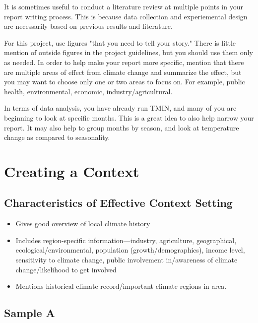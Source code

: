 \documentclass{article}\usepackage[]{graphicx}\usepackage[]{color}
\begin{document}
It is sometimes useful to conduct a literature review at multiple points in your report writing process. This is because data collection and experiemental design are necessarily based on previous results and literature.

For this project, use figures "that you need to tell your story." There is little mention of outside figures in the project guidelines, but you should use them only as needed. 
In order to help make your report more specific, mention that there are multiple areas of effect from climate change and summarize the effect, but you may want to choose only one or two areas to focus on. For example, public health, environmental, economic, industry/agricultural. 

In terms of data analysis, you have already run TMIN, and many of you are beginning to look at specific months. This is a great idea to also help narrow your report. It may also help to group months by season, and look at temperature change as compared to seasonality.

\section{Creating a Context}

\subsection{Characteristics of Effective Context Setting}

\begin{itemize}
  \item Gives good overview of local climate history
  \item Includes region-specific information—industry, agriculture, geographical, ecological/environmental, population (growth/demographics), income level, sensitivity to climate change, public involvement in/awareness of climate change/likelihood to get involved
  \item Mentions historical climate record/important climate regions in area.
\end{itemize}

\subsection{Sample A}
\end{document}
